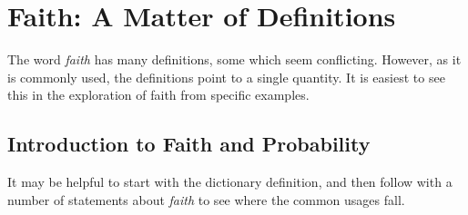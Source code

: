 \documentclass{tufte-book}
\begin{document}
\chapter{Faith: A Matter of
Definitions}\label{faith-a-matter-of-definitions}

The word \emph{faith} has many definitions, some which seem conflicting.
However, as it is commonly used, the definitions point to a single
quantity. It is easiest to see this in the exploration of faith from
specific examples.

\section{Introduction to Faith and
Probability}\label{introduction-to-faith-and-probability}

It may be helpful to start with the dictionary definition, and then
follow with a number of statements about \emph{faith} to see where the
common usages fall.
\end{document}
